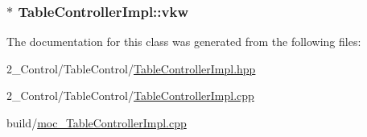 \subsubsection[{\texorpdfstring{vkw}{vkw}}]{$\ast$ Table\+Controller\+Impl\+::vkw\hspace{0.3cm}{\ttfamily [protected]}}\hypertarget{class_table_controller_impl_af7dbc908fb9205938c254f748649d555}{}\label{class_table_controller_impl_af7dbc908fb9205938c254f748649d555}


The documentation for this class was generated from the following files\+:\begin{DoxyCompactItemize}
\item 
2\+\_\+\+Control/\+Table\+Control/\hyperlink{_table_controller_impl_8hpp}{Table\+Controller\+Impl.\+hpp}\item 
2\+\_\+\+Control/\+Table\+Control/\hyperlink{_table_controller_impl_8cpp}{Table\+Controller\+Impl.\+cpp}\item 
build/\hyperlink{moc___table_controller_impl_8cpp}{moc\+\_\+\+Table\+Controller\+Impl.\+cpp}\end{DoxyCompactItemize}

